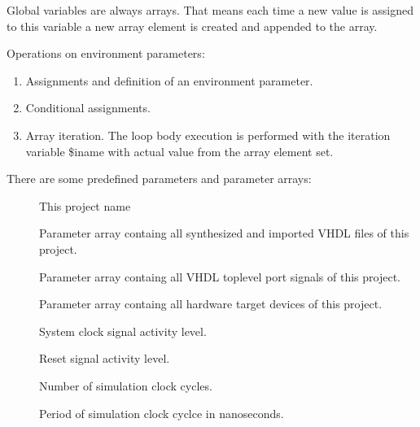 \documentclass[a4paper,12pt,twoside,english]{article}
\begin{document}
\begin{description}
Global variables are always arrays. That means each time a new value is assigned to this variable a new array element is created and appended to the array. 

Operations on environment parameters:


\begin{enumerate}
\item Assignments and definition of an environment parameter.

\item Conditional assignments.

\item Array iteration. The loop body execution is performed with the iteration variable \$iname with actual value from the array element set.  


\end{enumerate}
There are some predefined parameters and parameter arrays:


\begin{description}
\item[] $ $\\
This project name

\item[] $ $\\
Parameter array containg all  synthesized and imported VHDL files of this project.

\item[] $ $\\
Parameter array containg all VHDL toplevel port signals of this project.

\item[] $ $\\
Parameter array containg all  hardware target devices of this project.

\item[] $ $\\
System clock signal activity level.

\item[] $ $\\
Reset signal activity level.

\item[] $ $\\
Number of simulation clock cycles.

\item[] $ $\\
Period of simulation clock cyclce in nanoseconds.


\end{description}
\end{description}
\end{document}

